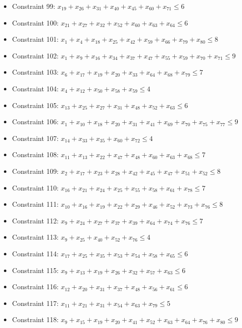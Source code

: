 \documentclass[11pt]{article}
\begin{document}
\begin{itemize}
\item Constraint 99: $x_{19} + x_{26} + x_{31} + x_{40} + x_{45} + x_{60} + x_{71} \le 6$
\item Constraint 100: $x_{21} + x_{27} + x_{32} + x_{52} + x_{60} + x_{63} + x_{64} \le 6$
\item Constraint 101: $x_{1} + x_{4} + x_{18} + x_{25} + x_{42} + x_{59} + x_{66} + x_{79} + x_{80} \le 8$
\item Constraint 102: $x_{1} + x_{9} + x_{16} + x_{34} + x_{37} + x_{47} + x_{55} + x_{59} + x_{70} + x_{71} \le 9$
\item Constraint 103: $x_{6} + x_{17} + x_{19} + x_{20} + x_{33} + x_{64} + x_{68} + x_{79} \le 7$
\item Constraint 104: $x_{4} + x_{12} + x_{50} + x_{58} + x_{59} \le 4$
\item Constraint 105: $x_{13} + x_{25} + x_{27} + x_{31} + x_{48} + x_{52} + x_{63} \le 6$
\item Constraint 106: $x_{1} + x_{10} + x_{18} + x_{20} + x_{31} + x_{41} + x_{69} + x_{70} + x_{75} + x_{77} \le 9$
\item Constraint 107: $x_{14} + x_{33} + x_{35} + x_{60} + x_{72} \le 4$
\item Constraint 108: $x_{11} + x_{13} + x_{22} + x_{47} + x_{48} + x_{60} + x_{63} + x_{68} \le 7$
\item Constraint 109: $x_{2} + x_{17} + x_{23} + x_{28} + x_{42} + x_{45} + x_{47} + x_{51} + x_{52} \le 8$
\item Constraint 110: $x_{16} + x_{21} + x_{24} + x_{25} + x_{55} + x_{58} + x_{61} + x_{78} \le 7$
\item Constraint 111: $x_{10} + x_{16} + x_{19} + x_{22} + x_{29} + x_{46} + x_{52} + x_{73} + x_{76} \le 8$
\item Constraint 112: $x_{9} + x_{24} + x_{27} + x_{37} + x_{39} + x_{64} + x_{74} + x_{76} \le 7$
\item Constraint 113: $x_{9} + x_{25} + x_{40} + x_{52} + x_{76} \le 4$
\item Constraint 114: $x_{17} + x_{25} + x_{35} + x_{53} + x_{54} + x_{58} + x_{65} \le 6$
\item Constraint 115: $x_{9} + x_{13} + x_{19} + x_{26} + x_{32} + x_{57} + x_{63} \le 6$
\item Constraint 116: $x_{12} + x_{20} + x_{31} + x_{37} + x_{48} + x_{56} + x_{61} \le 6$
\item Constraint 117: $x_{11} + x_{21} + x_{31} + x_{54} + x_{63} + x_{79} \le 5$
\item Constraint 118: $x_{9} + x_{15} + x_{19} + x_{20} + x_{41} + x_{52} + x_{63} + x_{64} + x_{76} + x_{80} \le 9$

\end{itemize}
\end{document}
